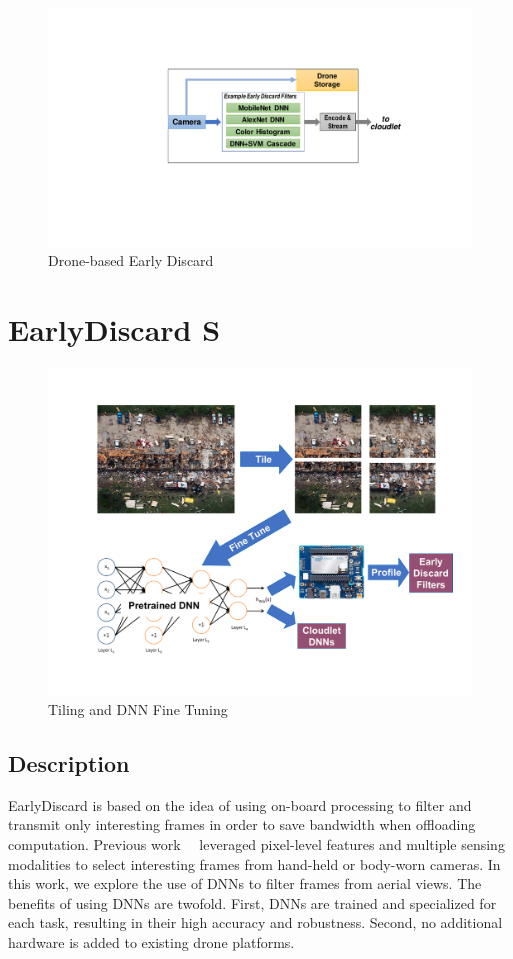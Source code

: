 \begin{figure}
\includegraphics[trim={9cm 6.5cm 5cm 4.8cm},clip,width=\linewidth]{FIGS/fig-ondrone-early-discard.pdf}
\caption{Drone-based Early Discard}
\label{fig:ondrone}
\vspace{-0.2in}
\end{figure}


\section{{\xc EarlyDiscard} S}
\label{sec:earlydiscard}

\begin{figure}
\centering
\includegraphics[width=0.8\linewidth]{FIGS/fig-training.pdf}
\caption{Tiling and DNN Fine Tuning}
\label{fig:tiling}
\end{figure}

\subsection{Description}
EarlyDiscard is based on the idea of using on-board processing to filter and
transmit only interesting frames in order to save bandwidth when offloading
computation. Previous work~\cite{Hu2015}~\cite{Naderiparizi2017} leveraged
pixel-level features and multiple sensing modalities to select interesting
frames from hand-held or body-worn cameras. In this work, we explore the use
of DNNs to filter frames from aerial views. The benefits of using DNNs are
twofold. First, DNNs are trained and specialized for each task, resulting in
their high accuracy and robustness. Second, no additional hardware is added to
existing drone platforms.

